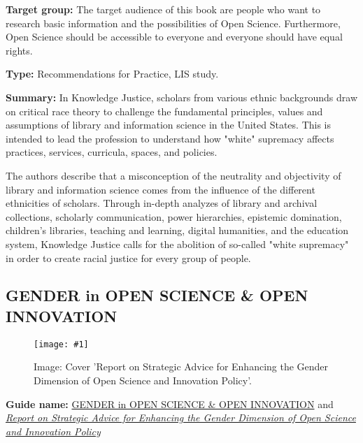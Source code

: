 \documentclass{article}
\newlength{\imgwidth}
\newcommand\scaledgraphics[2]{%
                
\settowidth{\imgwidth}{\texttt{[image: \#1]}}%
                
\setlength{\imgwidth}{\minof{\imgwidth}{#2\textwidth}}%
                
\texttt{[image: \#1]}%
                
}
\begin{document}
\textbf{Target group:} The target audience of this book are people who want to research basic information and the possibilities of Open Science. Furthermore, Open Science should be accessible to everyone and everyone should have equal rights.


\textbf{Type:} Recommendations for Practice, LIS study.


\textbf{Summary:} In Knowledge Justice, scholars from various ethnic backgrounds draw on critical race theory to challenge the fundamental principles, values ​​and assumptions of library and information science in the United States. This is intended to lead the profession to understand how "white" supremacy affects practices, services, curricula, spaces, and policies.


The authors describe that a misconception of the neutrality and objectivity of library and information science comes from the influence of the different ethnicities of scholars. Through in-depth analyzes of library and archival collections, scholarly communication, power hierarchies, epistemic domination, children's libraries, teaching and learning, digital humanities, and the education system, Knowledge Justice calls for the abolition of so-called "white supremacy" in order to create racial justice for every group of people.


\subsection{GENDER in OPEN SCIENCE \& OPEN INNOVATION}\label{H6993921}



\begin{center}
\begin{figure}
\scaledgraphics{59987ee5-bc7e-4c52-98de-ba70e420a252.jpg}{0.5}
\caption*{Image: Cover 'Report on Strategic Advice for Enhancing the Gender Dimension of Open Science and Innovation Policy'.}\label{F24284111}
\end{figure}


\end{center}


\textbf{Guide name: }\href{https://genderaction.eu/wp-content/uploads/2018/07/GENDERACTION_PolicyBrief5_Gender-OSOI.pdf}{GENDER in OPEN SCIENCE \& OPEN INNOVATION} \autocite{gender_action_gender_2018} and \emph{\href{https://genderaction.eu/wp-content/uploads/2019/04/GENDERACTION_Report-5.1_D11_OSOI.pdf}{Report on Strategic Advice for Enhancing the Gender Dimension of Open Science and Innovation Policy}}\emph{ }\autocite{institute_of_sociology_report_2019}
\end{document}
